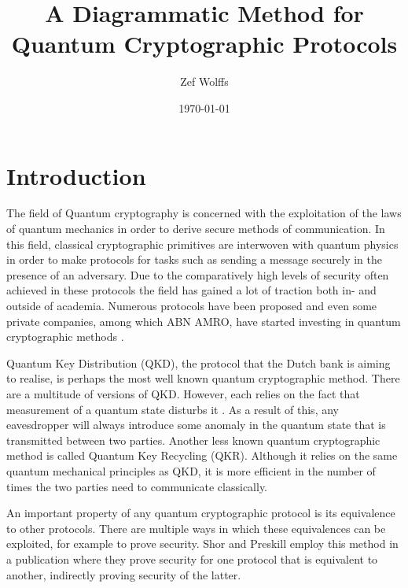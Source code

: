 \documentclass[%
 reprint,
nofootinbib,
 amsmath,amssymb,
 aps,
]{revtex4-2}
\begin{document}
\title{A Diagrammatic Method for Quantum Cryptographic Protocols}%

\author{Zef Wolffs} 
%

\date{\today}%


\maketitle

\section{Introduction}

The field of Quantum cryptography is concerned with the exploitation of the laws of quantum mechanics in order to derive secure methods of communication. In this field, classical cryptographic primitives are interwoven with quantum physics in order to make protocols for tasks such as sending a message securely in the presence of an adversary. Due to the comparatively high levels of security often achieved in these protocols the field has gained a lot of traction both in- and outside of academia. Numerous protocols have been proposed \cite{Broadbent2016} and even some private companies, among which ABN AMRO, have started investing in quantum cryptographic methods \cite{abnamro}. 

Quantum Key Distribution (QKD), the protocol that the Dutch bank is aiming to realise, is perhaps the most well known quantum cryptographic method. There are a multitude of versions of QKD. However, each relies on the fact that measurement of a quantum state disturbs it \cite{Lindblad1999}. As a result of this, any eavesdropper will always introduce some anomaly in the quantum state that is transmitted between two parties. Another less known quantum cryptographic method is called Quantum Key Recycling (QKR). Although it relies on the same quantum mechanical principles as QKD, it is more efficient in the number of times the two parties need to communicate classically. 

An important property of any quantum cryptographic protocol is its equivalence to other protocols. There are multiple ways in which these equivalences can be exploited, for example to prove security. Shor and Preskill employ this method in a publication \cite{Shor2000} where they prove security for one protocol that is equivalent to another, indirectly proving security of the latter.
\end{document}
